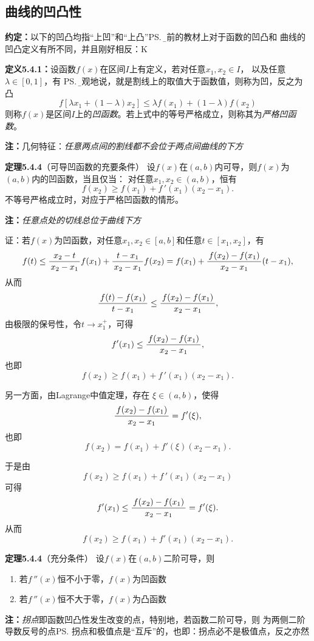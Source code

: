 \subsection{曲线的凹凸性}

{\bf 约定：}以下的凹凸均指“上凹”和“上凸”\ps{\b 目前的教材上对于函数的凹凸和
曲线的凹凸定义有所不同，并且刚好相反：K}

{\bf 定义5.4.1：}设函数$f(x)$在区间$I$上有定义，若对任意$x_1,x_2\in I$，
以及任意$\lambda\in[0,1]$，有
\ps{\b 直观地说，就是割线上的取值大于函数值，则称为凹，反之为凸}
$$f[\lambda x_1+(1-\lambda)x_2]\leq\lambda f(x_1)+(1-\lambda)f(x_2)$$
则称$f(x)$是区间$I$上的{\it 凹函数}。若上式中的等号严格成立，则称其为{\it 严格凹函数}。

{\bf 注：}几何特征：{\it 任意两点间的割线都不会位于两点间曲线的下方}

{\bf 定理5.4.4}（可导凹函数的充要条件）
设$f(x)$在$(a,b)$内可导，则$f(x)$为$(a,b)$内的凹函数，当且仅当：
对任意$x_1,x_2\in(a,b)$，恒有
$$f(x_2)\geq f(x_1)+f\,'(x_1)(x_2-x_1). $$
不等号严格成立时，对应于严格凹函数的情形。

{\bf 注：}{\it 任意点处的切线总位于曲线下方}

证：若$f(x)$为凹函数，对任意$x_1,x_2\in[a,b]$和任意$t\in[x_1,x_2]$，有
$$f(t)\leq\displaystyle\frac{\,{x_2-t}\,}{\,{x_2-x_1}\,}f(x_1)+\displaystyle\frac{\,{t-x_1}\,}{\,{x_2-x_1}\,}f(x_2)
=f(x_1)+\displaystyle\frac{\,{f(x_2)-f(x_1)}\,}{\,{x_2-x_1}\,}(t-x_1),$$
从而
$$\displaystyle\frac{\,{f(t)-f(x_1)}\,}{\,{t-x_1}\,}\leq\displaystyle\frac{\,{f(x_2)-f(x_1)}\,}{\,{x_2-x_1}\,},$$
由极限的保号性，令$t\to x_1^+$，可得
$$f'(x_1)\leq\displaystyle\frac{\,{f(x_2)-f(x_1)}\,}{\,{x_2-x_1}\,},$$
也即
$$f(x_2)\geq f(x_1)+f\,'(x_1)(x_2-x_1).$$

另一方面，由Lagrange中值定理，存在
$\xi\in(a,b)$，使得
$$\displaystyle\frac{\,{f(x_2)-f(x_1)}\,}{\,{x_2-x_1}\,}=f'(\xi),$$
也即
$$f(x_2)=f(x_1)+f'(\xi)(x_2-x_1).$$

于是由
$$f(x_2)\geq f(x_1)+f\,'(x_1)(x_2-x_1)$$
可得
$$f'(x_1)\leq\displaystyle\frac{\,{f(x_2)-f(x_1)}\,}{\,{x_2-x_1}\,}=f'(\xi).$$
从而
$$f(x_2)\geq f(x_1)+f'(x_1)(x_2-x_1).$$

{\bf 定理5.4.4}（充分条件）
设$f(x)$在$(a,b)$二阶可导，则
\begin{enumerate}[(1)]
  \setlength{\itemindent}{1cm}
  \item 若$f\,''(x)$恒不小于零，$f(x)$为凹函数
  \item 若$f\,''(x)$恒不大于零，$f(x)$为凸函数
\end{enumerate}

{\bf 注：}{\b{\it 拐点}即函数凹凸性发生改变的点，特别地，若函数二阶可导，则
为两侧二阶导数反号的点}\ps{拐点和极值点是“互斥”的，也即：拐点必不是极值点，反之亦然}

